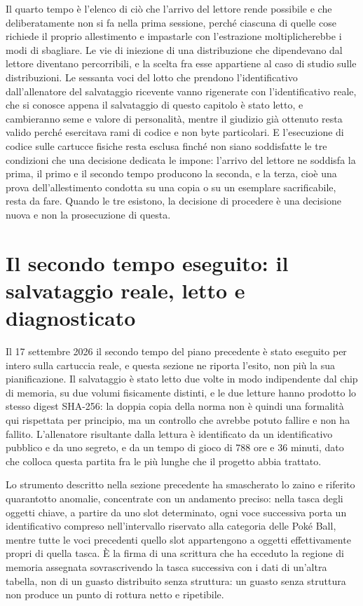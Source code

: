 Il quarto tempo è l'elenco di ciò che l'arrivo del lettore rende possibile e che deliberatamente non si fa nella prima sessione, perché ciascuna di quelle cose richiede il proprio allestimento e impastarle con l'estrazione moltiplicherebbe i modi di sbagliare. Le vie di iniezione di una distribuzione che dipendevano dal lettore diventano percorribili, e la scelta fra esse appartiene al caso di studio sulle distribuzioni. Le sessanta voci del lotto che prendono l'identificativo dall'allenatore del salvataggio ricevente vanno rigenerate con l'identificativo reale, che si conosce appena il salvataggio di questo capitolo è stato letto, e cambieranno seme e valore di personalità, mentre il giudizio già ottenuto resta valido perché esercitava rami di codice e non byte particolari. E l'esecuzione di codice sulle cartucce fisiche resta esclusa finché non siano soddisfatte le tre condizioni che una decisione dedicata le impone: l'arrivo del lettore ne soddisfa la prima, il primo e il secondo tempo producono la seconda, e la terza, cioè una prova dell'allestimento condotta su una copia o su un esemplare sacrificabile, resta da fare. Quando le tre esistono, la decisione di procedere è una decisione nuova e non la prosecuzione di questa.

\section{Il secondo tempo eseguito: il salvataggio reale, letto e diagnosticato}

Il 17 settembre 2026 il secondo tempo del piano precedente è stato eseguito per intero sulla cartuccia reale, e questa sezione ne riporta l'esito, non più la sua pianificazione. Il salvataggio è stato letto due volte in modo indipendente dal chip di memoria, su due volumi fisicamente distinti, e le due letture hanno prodotto lo stesso digest SHA-256: la doppia copia della norma non è quindi una formalità qui rispettata per principio, ma un controllo che avrebbe potuto fallire e non ha fallito. L'allenatore risultante dalla lettura è identificato da un identificativo pubblico e da uno segreto, e da un tempo di gioco di 788 ore e 36 minuti, dato che colloca questa partita fra le più lunghe che il progetto abbia trattato.

Lo strumento descritto nella sezione precedente ha smascherato lo zaino e riferito quarantotto anomalie, concentrate con un andamento preciso: nella tasca degli oggetti chiave, a partire da uno slot determinato, ogni voce successiva porta un identificativo compreso nell'intervallo riservato alla categoria delle Poké Ball, mentre tutte le voci precedenti quello slot appartengono a oggetti effettivamente propri di quella tasca. È la firma di una scrittura che ha ecceduto la regione di memoria assegnata sovrascrivendo la tasca successiva con i dati di un'altra tabella, non di un guasto distribuito senza struttura: un guasto senza struttura non produce un punto di rottura netto e ripetibile.

